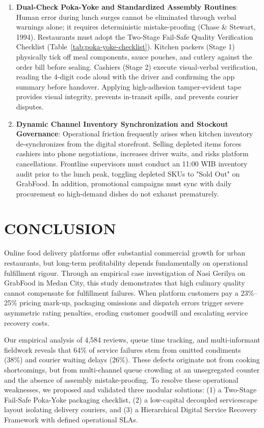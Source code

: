 \documentclass{jomas}
\begin{document}
\begin{enumerate}[leftmargin=*,label=\textbf{\arabic*.},itemsep=1pt,topsep=1pt]
    \item \textbf{Dual-Check Poka-Yoke and Standardized Assembly Routines}:
    Human error during lunch surges cannot be eliminated through verbal warnings alone; it requires deterministic mistake-proofing (Chase \& Stewart, 1994). Restaurants must adopt the Two-Stage Fail-Safe Quality Verification Checklist (Table~\ref{tab:poka-yoke-checklist}). Kitchen packers (Stage 1) physically tick off meal components, sauce pouches, and cutlery against the order bill before sealing. Cashiers (Stage 2) execute visual-verbal verification, reading the 4-digit code aloud with the driver and confirming the app summary before handover. Applying high-adhesion tamper-evident tape provides visual integrity, prevents in-transit spills, and prevents courier disputes.

    \item \textbf{Dynamic Channel Inventory Synchronization and Stockout Governance}:
    Operational friction frequently arises when kitchen inventory de-synchronizes from the digital storefront. Selling depleted items forces cashiers into phone negotiations, increases driver waits, and risks platform cancellations. Frontline supervisors must conduct an 11:00 WIB inventory audit prior to the lunch peak, toggling depleted SKUs to "Sold Out" on GrabFood. In addition, promotional campaigns must sync with daily procurement so high-demand dishes do not exhaust prematurely.
\end{enumerate}

\section{CONCLUSION}
Online food delivery platforms offer substantial commercial growth for urban restaurants, but long-term profitability depends fundamentally on operational fulfillment rigour. Through an empirical case investigation of Nasi Gerilya on GrabFood in Medan City, this study demonstrates that high culinary quality cannot compensate for fulfillment failures. When platform customers pay a 23\%--25\% pricing mark-up, packaging omissions and dispatch errors trigger severe asymmetric rating penalties, eroding customer goodwill and escalating service recovery costs.

Our empirical analysis of 4,584 reviews, queue time tracking, and multi-informant fieldwork reveals that 64\% of service failures stem from omitted condiments (38\%) and courier waiting delays (26\%). These defects originate not from cooking shortcomings, but from multi-channel queue crowding at an unsegregated counter and the absence of assembly mistake-proofing. To resolve these operational weaknesses, we proposed and validated three modular solutions: (1) a Two-Stage Fail-Safe Poka-Yoke packaging checklist, (2) a low-capital decoupled servicescape layout isolating delivery couriers, and (3) a Hierarchical Digital Service Recovery Framework with defined operational SLAs.
\end{document}
